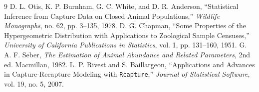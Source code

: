 \documentclass[11pt,a4paper]{article}
\begin{document}
\begin{thebibliography}{9}
 D. L. Otis, K. P. Burnham, G. C. White, and D. R. Anderson, ``Statistical Inference from Capture Data on Closed Animal Populations,'' \textit{Wildlife Monographs}, no. 62, pp. 3--135, 1978.
 D. G. Chapman, ``Some Properties of the Hypergeometric Distribution with Applications to Zoological Sample Censuses,'' \textit{University of California Publications in Statistics}, vol. 1, pp. 131--160, 1951.
 G. A. F. Seber, \textit{The Estimation of Animal Abundance and Related Parameters}, 2nd ed. Macmillan, 1982.
 L. P. Rivest and S. Baillargeon, ``Applications and Advances in Capture-Recapture Modeling with \texttt{Rcapture},'' \textit{Journal of Statistical Software}, vol. 19, no. 5, 2007.
\end{thebibliography}
\end{document}
